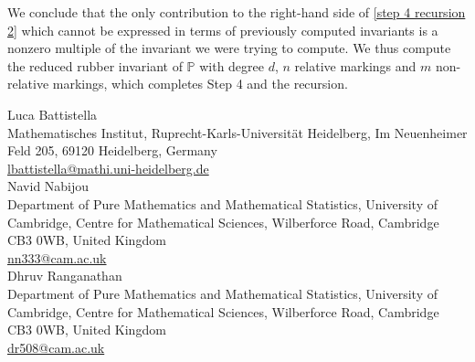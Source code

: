 \documentclass[11pt]{amsart}
\newcommand{\PP}{\mathbb P}
\theoremstyle{definition}
\theoremstyle{definition}
\begin{document}
We conclude that the only contribution to the right-hand side of \eqref{step 4 recursion 2} which cannot be expressed in terms of previously computed invariants is a nonzero multiple of the invariant we were trying to compute. We thus compute the reduced rubber invariant of $\PP$ with degree $d$, $n$ relative markings and $m$ non-relative markings, which completes Step 4 and the recursion.

\footnotesize




\bigskip\bigskip

\noindent Luca Battistella\\
Mathematisches Institut, Ruprecht-Karls-Universit\"at Heidelberg, Im Neuenheimer Feld 205, 69120 Heidelberg, Germany \\
\href{mailto:lbattistella@mathi.uni-heidelberg.de}{lbattistella@mathi.uni-heidelberg.de}\\

\noindent Navid Nabijou \\
Department of Pure Mathematics and Mathematical Statistics, University of Cambridge, Centre for Mathematical Sciences, Wilberforce Road, Cambridge CB3 0WB, United Kingdom \\
\href{mailto:nn333@cam.ac.uk}{nn333@cam.ac.uk}\\

\noindent Dhruv Ranganathan \\
Department of Pure Mathematics and Mathematical Statistics, University of Cambridge, Centre for Mathematical Sciences, Wilberforce Road, Cambridge CB3 0WB, United Kingdom \\
\href{mailto:dr508@cam.ac.uk}{dr508@cam.ac.uk}
\end{document}
